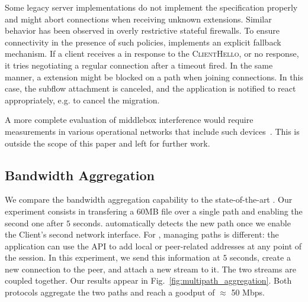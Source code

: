 Some legacy \tls server implementations do not implement the \tls
specification properly and might abort connections when receiving unknown \tls
extensions. Similar behavior has been observed in overly restrictive stateful
firewalls. To ensure connectivity in the presence of such policies, \tcpls
implements an explicit fallback mechanism. If a client receives a \tcp \rst in
response to the \tcpls \textsc{ClientHello}, or no response, it
tries negotiating a regular \tls connection after a timeout fired. 
In the same manner, a \join extension might be
blocked on a path when joining connections. In this case, the subflow 
attachment is canceled, and
the application is notified to react appropriately, e.g. to cancel the 
migration.

A more complete evaluation of middlebox interference would require measurements 
in various operational networks that include such 
devices~\cite{honda2011still,raman2020measuring,o2016tls}. This is
outside the scope of this paper and left for further work. 



\subsection{Bandwidth Aggregation}
\label{sec:bwaggr}
We compare the \tcpls bandwidth aggregation capability to the state-of-the-art
\mptcp. 
Our experiment consists in transfering a 60MB file over a single path
and enabling the second one after $5$ seconds. \mptcp automatically detects
the new path once we enable the Client's second network interface. For \tcpls,
managing paths is different: the application can use the API to add local or
peer-related addresses at any point of the session. In this experiment, we send
this information at $5$ seconds, create a new \tcp connection to the peer, and
attach a new stream to it. The two streams are coupled together. Our results 
appear in Fig.~\ref{fig:multipath_aggregation}. Both protocols aggregate the 
two paths and reach a goodput of $\approx$ 50 Mbps. 

